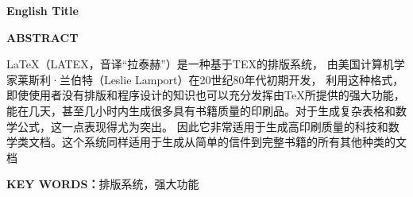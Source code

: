 
\begin{center}\heiti\sanhao\bfseries
        English Title

\end{center}

\begin{center}\heiti\sanhao\textbf{
        ABSTRACT
    }
\end{center}

LaTeX（LATEX，音译“拉泰赫”）是一种基于ΤΕΧ的排版系统，
由美国计算机学家莱斯利·兰伯特（Leslie Lamport）在20世纪80年代初期开发，
利用这种格式，即使使用者没有排版和程序设计的知识也可以充分发挥由TeX所提供的强大功能，
能在几天，甚至几小时内生成很多具有书籍质量的印刷品。对于生成复杂表格和数学公式，这一点表现得尤为突出。
因此它非常适用于生成高印刷质量的科技和数学类文档。这个系统同样适用于生成从简单的信件到完整书籍的所有其他种类的文档
  
\noindent \textbf{KEY WORDS：}排版系统，强大功能

\clearpage